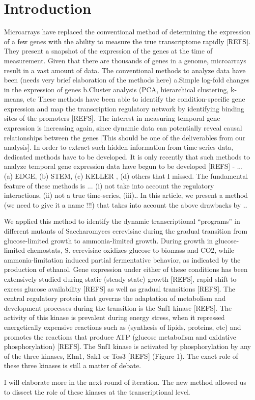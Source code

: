 \documentclass{bioinfo}
\begin{document}
\section{Introduction}

Microarrays have replaced the conventional method of determining the
expression of a few genes with the ability to measure the true
transcriptome rapidly [REFS]. They present a snapshot of the
expression of the genes at the time of measurement. Given that there
are thousands of genes in a genome, microarrays result in a vast
amount of data. The conventional methods to analyze data have been
(needs very brief elaboration of the methods here) a.Simple log-fold
changes in the expression of genes b.Cluster analysis (PCA,
hierarchical clustering, k-means, etc These methods have been able to
identify the condition-specific gene expression and map the
transcription regulatory network by identifying binding sites of the
promoters [REFS]. The interest in measuring temporal gene expression
is increasing again, since dynamic data can potentially reveal causal
relationships between the genes [This should be one of the
deliverables from our analysis]. In order to extract such hidden
information from time-series data, dedicated methods have to be
developed. It is only recently that such methods to analyze temporal
gene expression data have begun to be developed [REFS] - ...(a) EDGE,
(b) STEM, (c) KELLER , (d) others that I missed. The fundamental
feature of these methods is ... (i) not take into account the regulatory
interactions, (ii) not a true time-series, (iii)..  In this article,
we present a method (we need to give it a name !!!) that takes into
account the above drawbacks by ..

We applied this method to identify the dynamic transcriptional
``programs'' in different mutants of Saccharomyces cerevisiae during the
gradual transition from glucose-limited growth to ammonia-limited
growth. During growth in glucose-limited chemostats, S. cerevisiae
oxidizes glucose to biomass and CO2, while ammonia-limitation induced
partial fermentative behavior, as indicated by the production of
ethanol. Gene expression under either of these conditions has been
extensively studied during static (steady-state) growth [REFS], rapid
shift to excess glucose availability [REFS] as well as gradual
transitions [REFS]. The central regulatory protein that governs the
adaptation of metabolism and development processes during the
transition is the Snf1 kinase [REFS]. The activity of this kinase is
prevalent during energy stress, when it repressed energetically
expensive reactions such as (synthesis of lipids, proteins, etc) and
promotes the reactions that produce ATP (glucose metabolism and
oxidative phosphorylation) [REFS]. The Snf1 kinase is activated by
phosphorylation by any of the three kinases, Elm1, Sak1 or Tos3 [REFS]
(Figure 1). The exact role of these three kinases is still a matter of
debate. 
\begin{remark}[Gautham: ]
I will elaborate more in the next round of iteration. The new
method allowed us to dissect the role of these kinases at the
transcriptional level.
\end{remark}
\end{document}

